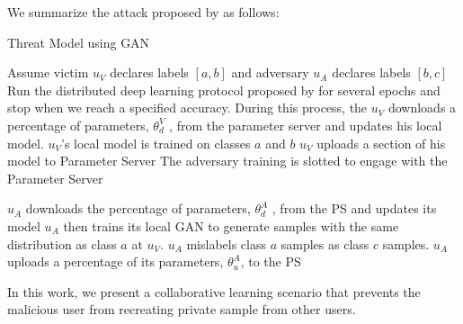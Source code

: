\documentclass[conference]{IEEEtran}
\begin{document}
We summarize the attack proposed by \cite{hitaj2017deep} as follows:

\begin{algorithm}
 \caption{Threat Model using GAN}
  \begin{algorithmic}[1]
    \State Assume victim $u_V$ declares labels $[a,b]$ and adversary $u_A$ declares labels $[b,c]$
    \State Run the distributed deep learning protocol proposed by\cite{shokri2015privacy} for several epochs and stop when we reach a specified accuracy.
   \State During this process, the $u_V$ downloads a percentage  of parameters, $\theta^V_d$ ,  from the parameter server and updates his local model.
    \State $u_V$'s local model is trained on classes $a$ and $b$
    \State $u_V$ uploads a section of his model to Parameter Server
    \State The adversary training is slotted to engage with the Parameter Server
    \item $u_A$ downloads the percentage of parameters, $\theta^A_d$ , from the PS and updates its model
   \State $u_A$ then trains its local GAN to generate samples with the same
    distribution as class $a$ at $u_V$.
    \State $u_A$  mislabels class $a$ samples as class $c$ samples.
    \State $u_A$ uploads a percentage of its parameters, $\theta^A_u$, to the PS
  \end{algorithmic}
\end{algorithm}



In this work, we present a collaborative learning scenario that prevents the malicious user from recreating private sample
from other users. 



\end{document}
